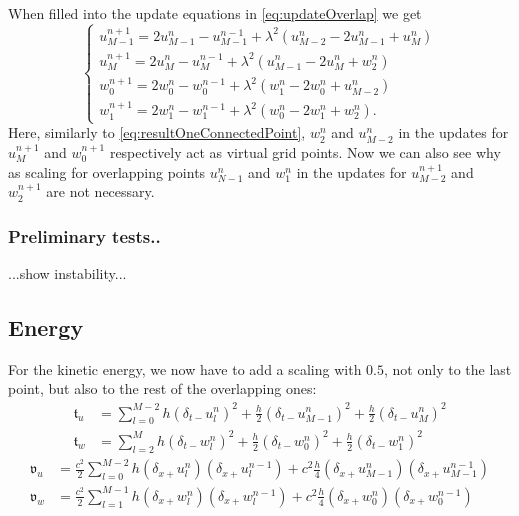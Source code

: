 \documentclass[dvipsnames]{article}
\begin{document}
When filled into the update equations in \eqref{eq:updateOverlap} we get 
\begin{equation}\label{eq:updateOverlap}
    \begin{cases}
        u_{M-1}^{n+1} = 2u_{M-1}^n - u_{M-1}^{n-1} + \lambda^2 (u_{M-2}^n - 2u_{M-1}^n + u_{M}^n)\\
        u_{M}^{n+1} = 2u_{M}^n - u_{M}^{n-1} + \lambda^2 (u_{M-1}^n - 2u_M^n + w_2^n)\\
        w_0^{n+1} = 2w_0^n-w_0^{n-1} + \lambda^2 (w_1^n-2w_0^n+u_{M-2}^n)\\
        w_1^{n+1} = 2w_1^n-w_1^{n-1} + \lambda^2 (w_0^n-2w_1^n+w_2^n).
    \end{cases}
\end{equation}
Here, similarly to \eqref{eq:resultOneConnectedPoint}, $w_2^n$ and $u_{M-2}^n$ in the updates for $u_M^{n+1}$ and $w_0^{n+1}$ respectively act as virtual grid points.
Now we can also see why as scaling for overlapping points $u_{N-1}^n$ and $w_1^n$ in the updates for $u_{M-2}^{n+1}$ and $w_2^{n+1}$ are not necessary.

\subsubsection{Preliminary tests..}
...show instability...

\subsection{Energy}
For the kinetic energy, we now have to add a scaling with $0.5$, not only to the last point, but also to the rest of the overlapping ones:
\begin{align}
    \mathfrak{t}_u &= \sum_{l=0}^{M-2}   h(\delta_{t-}u_l^n)^2 + \frac{h}{2}(\delta_{t-}u_{M-1}^n)^2 + \frac{h}{2}(\delta_{t-}u_M^n)^2\\
    \mathfrak{t}_w &= \sum_{l=2}^{M}h(\delta_{t-}w_l^n)^2 + \frac{h}{2}(\delta_{t-}w_0^n)^2 + \frac{h}{2}(\delta_{t-}w_1^n)^2
\end{align}
\begin{align}
    \mathfrak{v}_u &= \frac{c^2}{2}\sum_{l=0}^{M-2} h(\delta_{x+}u_l^n)(\delta_{x+}u_l^{n-1}) + c^2\frac{h}{4} (\delta_{x+}u_{M-1}^n)(\delta_{x+}u_{M-1}^{n-1})\\
    \mathfrak{v}_w &= \frac{c^2}{2}\sum_{l=1}^{M-1} h(\delta_{x+}w_l^n)(\delta_{x+}w_l^{n-1}) + c^2\frac{h}{4} (\delta_{x+}w_0^n)(\delta_{x+}w_0^{n-1})
\end{align}
\end{document}
